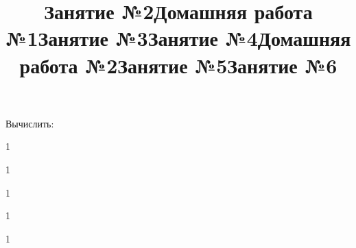 \begin{listofex}
	\item Вычислить:
	\begin{enumcols}[itemcolumns=2]
		\item {}
		\item {}
		\item {}
		\item {}
	\end{enumcols}
	\item {}
\end{listofex}
\newpage
\title{Занятие №2}
\begin{listofex}
	\item {}
	\item {}
	\item {}
	\item {}
	\item {}
	\item {}
	\item {}
	\item {}
\end{listofex}
\newpage
\title{Домашняя работа №1}
\begin{listofex}
	\item {} 
	\item {}
	\item {}
	\item {}
	\item {}
\end{listofex}
\newpage
\title{Занятие №3}
\begin{listofex}
	\item 1
\end{listofex}
\newpage
\title{Занятие №4}
\begin{listofex}
	\item 1
\end{listofex}
\newpage
\title{Домашняя работа №2}
\begin{listofex}
	\item 1
\end{listofex}
\newpage
\title{Занятие №5}
\begin{listofex}
	\item 1
\end{listofex}
\newpage
\title{Занятие №6}
\begin{listofex}
	\item 1
\end{listofex}
